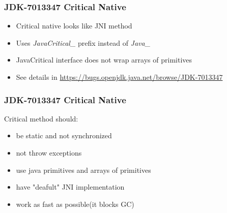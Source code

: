 \documentclass{beamer}
\begin{document}
  	\begin{frame}
  		\frametitle{JDK-7013347 Critical Native}
  		\begin{itemize}
  			\item Critical native looks like JNI method
  			\item Uses \textit{JavaCritical\_} prefix instead of \textit{Java\_}
  			\item JavaCritical interface does not wrap arrays	 of primitives
  			\item See details in \url{https://bugs.openjdk.java.net/browse/JDK-7013347}
  		\end{itemize}
  	\end{frame}
  	\begin{frame}
  		\frametitle{JDK-7013347 Critical Native}
  		Critical method should:	
  		\begin{itemize}
  			\item be static and not synchronized
  			\item not throw exceptions
  			\item use java primitives and arrays of primitives
  			\item have "deafult" JNI implementation
  			\item work as fast as possible(it blocks GC)
  		\end{itemize}
  	\end{frame}  
\end{document}
